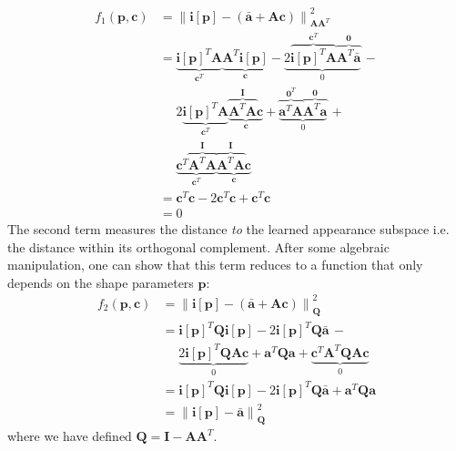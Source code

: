 \begin{equation}
    \begin{aligned}
        f_1(\mathbf{p}, \mathbf{c}) & = \left\| \mathbf{i}[\mathbf{p}] - \left( \bar{\mathbf{a}} + \mathbf{A} \mathbf{c} \right) \right\|_{\mathbf{A}\mathbf{A}^T}^2
        \\
        & = \underbrace{\mathbf{i}[\mathbf{p}]^T \mathbf{A}}_{\mathbf{c}^T} \underbrace{\mathbf{A}^T \mathbf{i}[\mathbf{p}]}_{\mathbf{c}} - \underbrace{2\overbrace{\mathbf{i}[\mathbf{p}]^T \mathbf{A}}^{\mathbf{c}^T} \overbrace{\mathbf{A}^T \bar{\mathbf{a}}}^{\mathbf{0}}}_{0} \, - 
        \\
        & \quad \,\, 2\underbrace{\mathbf{i}[\mathbf{p}]^T \mathbf{A}}_{\mathbf{c}^T} \underbrace{\overbrace{\mathbf{A}^T \mathbf{A}}^{\mathbf{I}} \mathbf{c}}_{\mathbf{c}} + \underbrace{\overbrace{\mathbf{a}^T \mathbf{A}}^{\mathbf{0}^T} \overbrace{\mathbf{A}^T \mathbf{a}}^{\mathbf{0}}}_{0} \, +
        \\
        & \quad \,\, \underbrace{\mathbf{c}^T \overbrace{\mathbf{A}^T \mathbf{A}}^{\mathbf{I}}}_{\mathbf{c}^T} \underbrace{\overbrace{\mathbf{A}^T \mathbf{A}}^{\mathbf{I}} \mathbf{c}}_{\mathbf{c}}
        \\
        & = \mathbf{c}^T\mathbf{c} - 2\mathbf{c}^T\mathbf{c} + \mathbf{c}^T\mathbf{c}
        \\
        & = 0
    \end{aligned}
\end{equation}
The second term measures the distance \emph{to} the learned appearance subspace i.e. the distance within its orthogonal complement. After some algebraic manipulation, one can show that this term reduces to a function that only depends on the shape parameters $\mathbf{p}$:
\begin{equation}
    \begin{aligned}
        f_2(\mathbf{p}, \mathbf{c}) & = \left\| \mathbf{i}[\mathbf{p}] - \left( \bar{\mathbf{a}} + \mathbf{A} \mathbf{c} \right) \right\|_{\mathbf{Q}}^2
        \\
        & = \mathbf{i}[\mathbf{p}]^T \mathbf{Q} \mathbf{i}[\mathbf{p}] - 2\mathbf{i}[\mathbf{p}]^T \mathbf{Q} \bar{\mathbf{a}} \, - 
        \\
        & \quad \,\, \underbrace{2\mathbf{i}[\mathbf{p}]^T \mathbf{Q} \mathbf{A}\mathbf{c}}_{0} + \mathbf{a}^T \mathbf{Q} \mathbf{a} + \underbrace{\mathbf{c}^T \mathbf{A}^T \mathbf{Q} \mathbf{A}\mathbf{c}}_{0}
        \\
        & = \mathbf{i}[\mathbf{p}]^T \mathbf{Q} \mathbf{i}[\mathbf{p}] - 2\mathbf{i}[\mathbf{p}]^T \mathbf{Q} \bar{\mathbf{a}} + \mathbf{a}^T \mathbf{Q} \mathbf{a}
        \\
        & = \left\| \mathbf{i}[\mathbf{p}] - \bar{\mathbf{a}} \right\|_{\mathbf{Q}}^2
    \end{aligned}
\end{equation}
where we have defined $\mathbf{Q}= \mathbf{I} -\mathbf{A}\mathbf{A}^T$. 

